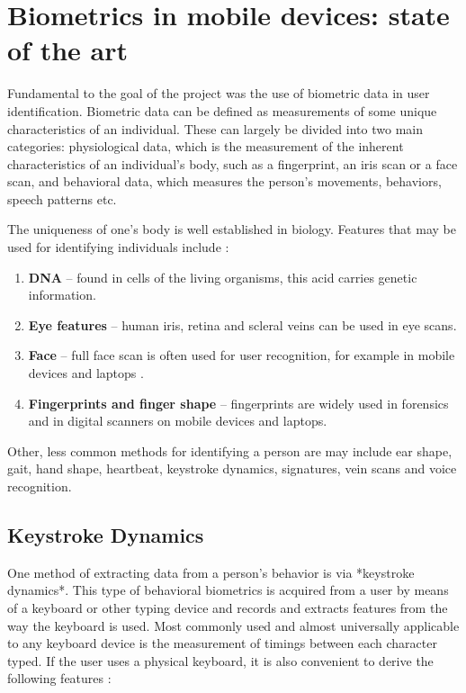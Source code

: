 
\chapter{Biometrics in mobile devices: state of the art} \label{biometrics_theory}

Fundamental to the goal of the project was the use of biometric data in user identification. Biometric data can be defined as measurements of some unique characteristics of an individual. These can largely be divided into two main categories: physiological data, which is the measurement of the inherent characteristics of an individual's body, such as a fingerprint, an iris scan or a face scan, and behavioral data, which measures the person's movements, behaviors, speech patterns etc. \cite{Abde2023}

The uniqueness of one's body is well established in biology. Features that may be used for identifying individuals include \cite{biometrics_institute_2025}:

\begin{enumerate}
    \item \textbf{DNA} -- found in cells of the living organisms, this acid carries genetic information.
    \item \textbf{Eye features} -- human iris, retina and scleral veins can be used in eye scans.
    \item \textbf{Face} -- full face scan is often used for user recognition, for example in mobile devices and laptops \cite{google_mlkit_face_detection_2025}.
    \item \textbf{Fingerprints and finger shape} -- fingerprints are widely used in forensics \cite{nist_forensic_biometrics_2025} and in digital scanners on mobile devices and laptops.
\end{enumerate}

Other, less common methods for identifying a person are may include ear shape, gait, hand shape, heartbeat, keystroke dynamics, signatures, vein scans and voice recognition.

\section{Keystroke Dynamics}
One method of extracting data from a person's behavior is via *keystroke dynamics*. This type of behavioral biometrics is acquired from a user by means of a keyboard or other typing device and records and extracts features from the way the keyboard is used. Most commonly used and almost universally applicable to any keyboard device is the measurement of timings between each character typed. If the user uses a physical keyboard, it is also convenient to derive the following features \cite{Shar2023}:

